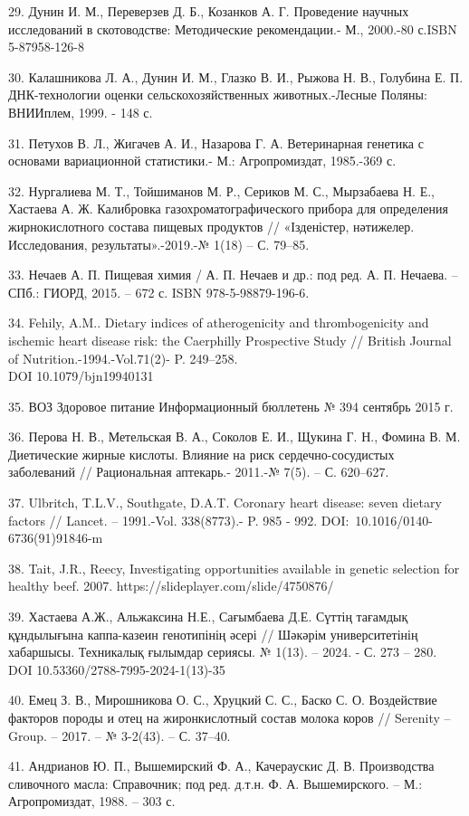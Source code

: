 \begin{noparindent}
29. Дунин И. М., Переверзев Д. Б., Козанков А. Г. Проведение научных
исследований в скотоводстве: Методические рекомендации.- М., 2000.-80
с.ISBN 5-87958-126-8

30. Калашникова Л. А., Дунин И. М., Глазко В. И., Рыжова Н. В., Голубина
Е. П. ДНК-технологии оценки сельскохозяйственных животных.-Лесные
Поляны: ВНИИплем, 1999. - 148 с.

31. Петухов В. Л., Жигачев А. И., Назарова Г. А. Ветеринарная генетика с
основами вариационной статистики.- М.: Агропромиздат, 1985.-369 с.

32. Нургалиева М. Т., Тойшиманов М. Р., Сериков М. С., Мырзабаева Н. Е.,
Хастаева А. Ж. Калибровка газохроматографического прибора для
определения жирнокислотного состава пищевых продуктов // «Ізденістер,
нәтижелер. Исследования, результаты».-2019.-№ 1(18) -- С. 79--85.

33. Нечаев А. П. Пищевая химия / А. П. Нечаев и др.: под ред. А. П.
Нечаева. -- СПб.: ГИОРД, 2015. -- 672 с. ISBN 978-5-98879-196-6.

34. Fehily, A.M.. Dietary indices of atherogenicity and thrombogenicity
and ischemic heart disease risk: the Caerphilly Prospective Study //
British Journal of Nutrition.-1994.-Vol.71(2)- P. 249--258. \\DOI
10.1079/bjn19940131

35. ВОЗ Здоровое питание Информационный бюллетень № 394 сентябрь 2015 г.

36. Перова Н. В., Метельская В. А., Соколов Е. И., Щукина Г. Н., Фомина
В. М. Диетические жирные кислоты. Влияние на риск сердечно-сосудистых
заболеваний // Рациональная аптекарь.- 2011.-№ 7(5). -- С. 620--627.

37. Ulbritch, T.L.V., Southgate, D.A.T. Coronary heart disease: seven
dietary factors // Lancet. -- 1991.-Vol. 338(8773).- P. 985 - 992.
DOI:~10.1016/0140-6736(91)91846-m

38. Tait, J.R., Reecy, Investigating opportunities available in genetic
selection for healthy beef. 2007. https://slideplayer.com/slide/4750876/

39. Хастаева А.Ж., Альжаксина Н.Е., Сағымбаева Д.Е. Сүттің тағамдық
құндылығына каппа-казеин генотипінің әсері // Шәкәрім университетінің
хабаршысы. Техникалық ғылымдар сериясы. № 1(13). -- 2024. - С. 273 --
280. DOI 10.53360/2788-7995-2024-1(13)-35

40. Емец З. В., Мирошникова О. С., Хруцкий С. С., Баско С. О.
Воздействие факторов породы и отец на жиронкислотный состав молока коров
// Serenity -- Group. -- 2017. -- № 3-2(43). -- С. 37--40.

41. Андрианов Ю. П., Вышемирский Ф. А., Качераускис Д. В. Производства
сливочного масла: Справочник; под ред. д.т.н. Ф. А. Вышемирского. -- М.:
Агропромиздат, 1988. -- 303 с.

\end{noparindent}

